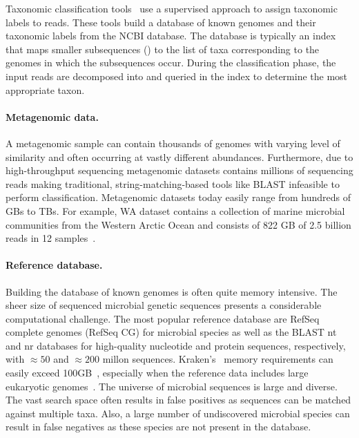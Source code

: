 Taxonomic classification tools~\cite{ames2013scalable, kim2016centrifuge, menzel2016fast, wood2014kraken, wood2019improved, dilthey2019strain,liu2018novel} use a supervised approach to assign taxonomic labels to reads.
These tools build a database of known genomes and their taxonomic labels from the NCBI database. 
The database is typically an index that maps smaller subsequences (\kmers) to the list of taxa corresponding to the genomes in which the subsequences occur. 
During the classification phase, the input reads are decomposed into \kmers and queried in the index to determine the most appropriate taxon.


\paragraph{Metagenomic data.}
A metagenomic sample can contain thousands of genomes with varying level of similarity and often occurring at vastly different abundances. Furthermore, due to high-throughput sequencing metagenomic datasets contains millions of sequencing reads making traditional, string-matching-based tools like BLAST infeasible to perform classification. Metagenomic datasets today easily range from hundreds of GBs to TBs. For example, WA dataset contains a collection of marine microbial communities from the Western Arctic Ocean and consists of 822 GB of 2.5 billion reads in 12 samples~\cite{hofmeyr2020terabase}.

\paragraph{Reference database.} 
Building the database of known genomes is often quite memory intensive.
The sheer size of sequenced microbial genetic sequences presents a considerable computational challenge.
The most popular reference database are RefSeq complete genomes (RefSeq CG) for microbial species as well as the BLAST nt and nr databases for high-quality nucleotide and protein sequences, respectively, with $\approx50$ and $\approx200$ millon sequences. 
Kraken's~\cite{wood2014kraken} memory requirements can easily exceed 100GB~\cite{simon2019benchmarking}, especially when the reference data includes large eukaryotic genomes~\cite{meiser2017sequencing, knutson2017porcine}.
%
The universe of microbial sequences is large and diverse. The vast search space often results in false positives as sequences can be matched against multiple taxa. Also, a large number of undiscovered microbial species can result in false negatives as these species are not present in the database.

